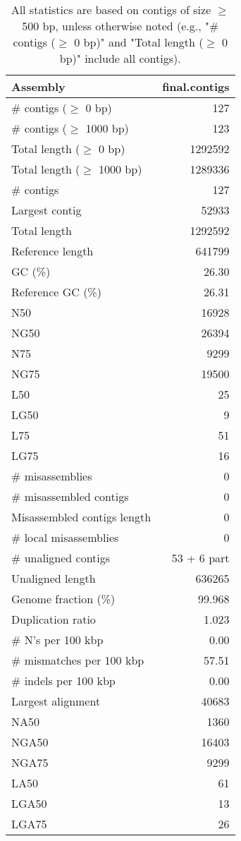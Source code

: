 \documentclass[12pt,a4paper]{article}
\begin{document}
\begin{table}[ht]
\begin{center}
\caption{All statistics are based on contigs of size $\geq$ 500 bp, unless otherwise noted (e.g., "\# contigs ($\geq$ 0 bp)" and "Total length ($\geq$ 0 bp)" include all contigs).}
\begin{tabular}{|l*{1}{|r}|}
\hline
Assembly & final.contigs \\ \hline
\# contigs ($\geq$ 0 bp) & 127 \\ \hline
\# contigs ($\geq$ 1000 bp) & 123 \\ \hline
Total length ($\geq$ 0 bp) & 1292592 \\ \hline
Total length ($\geq$ 1000 bp) & 1289336 \\ \hline
\# contigs & 127 \\ \hline
Largest contig & 52933 \\ \hline
Total length & 1292592 \\ \hline
Reference length & 641799 \\ \hline
GC (\%) & 26.30 \\ \hline
Reference GC (\%) & 26.31 \\ \hline
N50 & 16928 \\ \hline
NG50 & 26394 \\ \hline
N75 & 9299 \\ \hline
NG75 & 19500 \\ \hline
L50 & 25 \\ \hline
LG50 & 9 \\ \hline
L75 & 51 \\ \hline
LG75 & 16 \\ \hline
\# misassemblies & 0 \\ \hline
\# misassembled contigs & 0 \\ \hline
Misassembled contigs length & 0 \\ \hline
\# local misassemblies & 0 \\ \hline
\# unaligned contigs & 53 + 6 part \\ \hline
Unaligned length & 636265 \\ \hline
Genome fraction (\%) & 99.968 \\ \hline
Duplication ratio & 1.023 \\ \hline
\# N's per 100 kbp & 0.00 \\ \hline
\# mismatches per 100 kbp & 57.51 \\ \hline
\# indels per 100 kbp & 0.00 \\ \hline
Largest alignment & 40683 \\ \hline
NA50 & 1360 \\ \hline
NGA50 & 16403 \\ \hline
NGA75 & 9299 \\ \hline
LA50 & 61 \\ \hline
LGA50 & 13 \\ \hline
LGA75 & 26 \\ \hline
\end{tabular}
\end{center}
\end{table}
\end{document}
